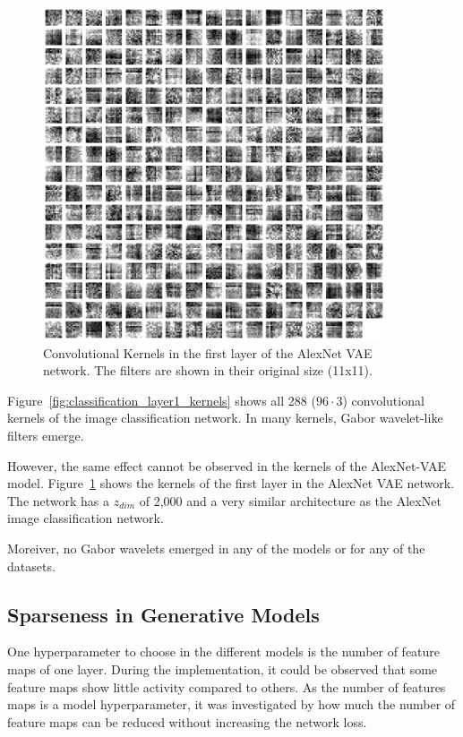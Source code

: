 \begin{figure}
    \centering
    \includegraphics[width=0.9\textwidth]{images/alexnet_vae_l1_kernels.png}
    \caption[\ac{VAE} - Layer 1 Kernels]{Convolutional Kernels in the first layer of the AlexNet \ac{VAE} network. The filters are shown in their original size (11x11).}
    \label{fig:vae_layer1_kernels}
\end{figure}

Figure~\ref{fig:classification_layer1_kernels} shows all 288 ($96 \cdot 3$) convolutional kernels of the image classification network.
In many kernels, Gabor wavelet-like filters emerge.

However, the same effect cannot be observed in the kernels of the AlexNet-\ac{VAE} model.
Figure~\ref{fig:vae_layer1_kernels} shows the kernels of the first layer in the AlexNet \ac{VAE} network.
The network has a $z_{dim}$ of 2,000 and a very similar architecture as the AlexNet image classification network.

Moreiver, no Gabor wavelets emerged in any of the models or for any of the datasets.


\subsection{Sparseness in Generative Models}\label{subsec:effective-network-capacity}
One hyperparameter to choose in the different models is the number of feature maps of one layer.
During the implementation, it could be observed that some feature maps show little activity compared to others.
As the number of features maps is a model hyperparameter, it was investigated by how much the number of feature maps can be reduced without increasing the network loss.


